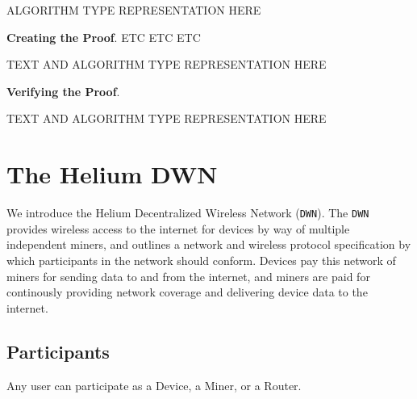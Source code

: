 \documentclass[letterpaper,11pt]{article}
\begin{document}
ALGORITHM TYPE REPRESENTATION HERE\newline

\textbf{Creating the Proof}. ETC ETC ETC\newline

TEXT AND ALGORITHM TYPE REPRESENTATION HERE\newline

\textbf{Verifying the Proof}.\newline

TEXT AND ALGORITHM TYPE REPRESENTATION HERE

\section{The Helium DWN}

We introduce the Helium Decentralized Wireless Network (\verb|DWN|). The \verb|DWN| provides wireless access to the internet for devices by way of multiple independent miners, and outlines a network and wireless protocol specification by which participants in the network should conform. Devices pay this network of miners for sending data to and from the internet, and miners are paid for continously providing network coverage and delivering device data to the internet. 

\subsection{Participants}

Any user can participate as a Device, a Miner, or a Router.
\end{document}
